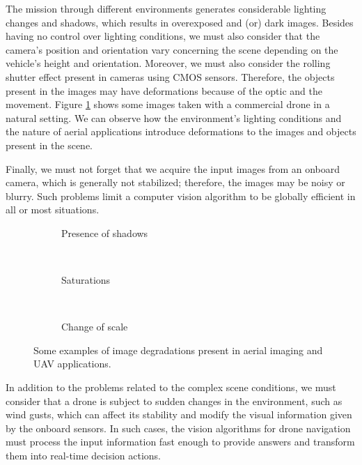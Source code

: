The mission through different environments generates considerable lighting changes and shadows, which results in overexposed and (or) dark images. Besides having no control over lighting conditions, we must also consider that the camera's position and orientation vary concerning the scene depending on the vehicle's height and orientation. Moreover, we must also consider the rolling shutter effect present in cameras using CMOS sensors. Therefore, the objects present in the images may have deformations because of the optic and the movement. Figure \ref{fig:img_drone_degradations} shows some images taken with a commercial drone in a natural setting. We can observe how the environment's lighting conditions and the nature of aerial applications introduce deformations to the images and objects present in the scene. 

Finally, we must not forget that we acquire the input images from an onboard camera, which is generally not stabilized; therefore, the images may be noisy or blurry. Such problems limit a computer vision algorithm to be globally efficient in all or most situations.


\begin{figure}[!ht]
    \centering
    \begin{subfigure}[b]{0.38\textwidth}
        \caption{Presence of shadows}
    \end{subfigure}
        ~ %
    \begin{subfigure}[b]{0.38\textwidth}
        \caption{Saturations}
    \end{subfigure}
        ~ %
    \begin{subfigure}[b]{0.38\textwidth}
        \caption{Change of scale}
    \end{subfigure} 
    \caption{Some examples of image degradations present in aerial imaging and UAV applications.}\label{fig:img_drone_degradations}
\end{figure}

In addition to the problems related to the complex scene conditions, we must consider that a drone is subject to sudden changes in the environment, such as wind gusts, which can affect its stability and modify the visual information given by the onboard sensors. In such cases, the vision algorithms for drone navigation must process the input information fast enough to provide answers and transform them into real-time decision actions.

